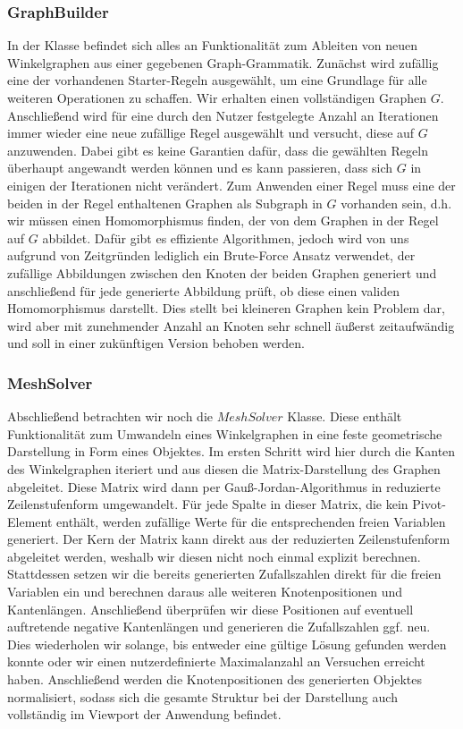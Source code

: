 \subsubsection{GraphBuilder}
In der  Klasse befindet sich alles an Funktionalität zum Ableiten von neuen Winkelgraphen aus einer gegebenen
Graph-Grammatik. Zunächst wird zufällig eine der vorhandenen Starter-Regeln ausgewählt, um eine Grundlage für alle weiteren Operationen
zu schaffen. Wir erhalten einen vollständigen Graphen \(G\). Anschließend wird für eine durch den Nutzer festgelegte Anzahl an
Iterationen immer wieder eine neue zufällige Regel ausgewählt und versucht, diese auf \(G\) anzuwenden. Dabei gibt es keine Garantien
dafür, dass die gewählten Regeln überhaupt angewandt werden können und es kann passieren, dass sich \(G\) in einigen der Iterationen
nicht verändert. Zum Anwenden einer Regel muss eine der beiden in der Regel enthaltenen Graphen als Subgraph in \(G\) vorhanden sein,
d.h. wir müssen einen Homomorphismus finden, der von dem Graphen in der Regel auf \(G\) abbildet. Dafür gibt es effiziente Algorithmen,
jedoch wird von uns aufgrund von Zeitgründen lediglich ein Brute-Force Ansatz verwendet, der zufällige Abbildungen zwischen den Knoten
der beiden Graphen generiert und anschließend für jede generierte Abbildung prüft, ob diese einen validen Homomorphismus darstellt.
Dies stellt bei kleineren Graphen kein Problem dar, wird aber mit zunehmender Anzahl an Knoten sehr schnell äußerst zeitaufwändig und
soll in einer zukünftigen Version behoben werden.

\subsubsection{MeshSolver}
Abschließend betrachten wir noch die \(MeshSolver\) Klasse. Diese enthält Funktionalität zum Umwandeln eines Winkelgraphen in eine
feste geometrische Darstellung in Form eines  Objektes. Im ersten Schritt wird hier durch die Kanten des
Winkelgraphen iteriert und aus diesen die Matrix-Darstellung des Graphen abgeleitet. Diese Matrix wird dann per Gauß-Jordan-Algorithmus
in reduzierte Zeilenstufenform umgewandelt. Für jede Spalte in dieser Matrix, die kein Pivot-Element enthält, werden zufällige
Werte für die entsprechenden freien Variablen generiert. Der Kern der Matrix kann direkt aus der reduzierten Zeilenstufenform
abgeleitet werden, weshalb wir diesen nicht noch einmal explizit berechnen. Stattdessen setzen wir die bereits generierten Zufallszahlen
direkt für die freien Variablen ein und berechnen daraus alle weiteren Knotenpositionen und Kantenlängen. Anschließend überprüfen wir
diese Positionen auf eventuell auftretende negative Kantenlängen und generieren die Zufallszahlen ggf. neu. Dies wiederholen wir solange,
bis entweder eine gültige Lösung gefunden werden konnte oder wir einen nutzerdefinierte Maximalanzahl an Versuchen erreicht haben.
Anschließend werden die Knotenpositionen des generierten  Objektes normalisiert, sodass sich die gesamte Struktur
bei der Darstellung auch vollständig im Viewport der Anwendung befindet.

